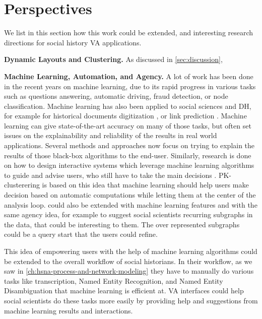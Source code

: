 \section{Perspectives}

We list in this section how this work could be extended, and interesting research directions for social history VA applications.


\noindent\textbf{Dynamic Layouts and Clustering.} As discussed in \autoref{sec:discussion},



\noindent\textbf{Machine Learning, Automation, and Agency.} A lot of work has been done in the recent years on machine learning, due to its rapid progress in various tasks such as questions answering, automatic driving, fraud detection, or node classification.
Machine learning has also been applied to social sciences and DH, for example for historical documents digitization \cite{philipsHistoricalDocumentProcessing2020}, or link prediction \cite{michalskiPredictingSocialNetwork2012}.
Machine learning can give state-of-the-art accuracy on many of those tasks, but often set issues on the explainability and reliability of the results in real world applications.
Several methods and approaches now focus on trying to explain the results of those black-box algorithms to the end-user.
Similarly, research is done on how to design interactive systems which leverage machine learning algorithms to guide and advise users, who still have to take the main decisions \cite{heerAgencyAutomationDesigning2019}.
PK-clusterering is based on this idea that machine learning should help users make decision based on automatic computations while letting them at the center of the analysis loop.
\name could also be extended with machine learning features and with the same agency idea, for example to suggest social scientists recurring subgraphs in the data, that could be interesting to them.
The over represented subgraphs could be a query start that the users could refine.

This idea of empowering users with the help of machine learning algorithms could be extended to the overall workflow of social historians.
In their workflow, as we saw in \autoref{ch:hsna-process-and-network-modeling} they have to manually do various tasks like transcription, Named Entity Recognition, and Named Entity Disambiguation that machine learning is efficient at.
VA interfaces could help social scientists do these tasks more easily by providing help and suggestions from  machine learning results and interactions.


